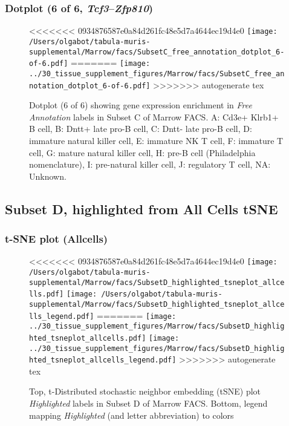 \subsubsection{Dotplot (6 of 6, \emph{Tcf3}--\emph{Zfp810})}
\begin{figure}[h]
\centering
<<<<<<< 0934876587e0a84d261fc48e5d7a4644ec19d4e0
\texttt{[image: /Users/olgabot/tabula-muris-supplemental/Marrow/facs/SubsetC\_free\_annotation\_dotplot\_6-of-6.pdf]}
=======
\texttt{[image: ../30\_tissue\_supplement\_figures/Marrow/facs/SubsetC\_free\_annotation\_dotplot\_6-of-6.pdf]}
>>>>>>> autogenerate tex

\caption{ Dotplot (6 of 6)  showing gene expression enrichment in \emph{Free Annotation} labels in Subset C of Marrow FACS. A: Cd3e+ Klrb1+ B cell, B: Dntt+ late pro-B cell, C: Dntt- late pro-B cell, D: immature natural killer cell, E: immature NK T cell, F: immature T cell, G: mature natural killer cell, H: pre-B cell (Philadelphia nomenclature), I: pre-natural killer cell, J: regulatory T cell, NA: Unknown.}
\end{figure}


\clearpage
\subsection{Subset D, highlighted from All Cells tSNE}
\subsubsection{t-SNE plot (Allcells)}
\begin{figure}[h]
\centering
<<<<<<< 0934876587e0a84d261fc48e5d7a4644ec19d4e0
\texttt{[image: /Users/olgabot/tabula-muris-supplemental/Marrow/facs/SubsetD\_highlighted\_tsneplot\_allcells.pdf]}
\texttt{[image: /Users/olgabot/tabula-muris-supplemental/Marrow/facs/SubsetD\_highlighted\_tsneplot\_allcells\_legend.pdf]}
=======
\texttt{[image: ../30\_tissue\_supplement\_figures/Marrow/facs/SubsetD\_highlighted\_tsneplot\_allcells.pdf]}
\texttt{[image: ../30\_tissue\_supplement\_figures/Marrow/facs/SubsetD\_highlighted\_tsneplot\_allcells\_legend.pdf]}
>>>>>>> autogenerate tex
\caption{Top, t-Distributed stochastic neighbor embedding (tSNE) plot  \emph{Highlighted} labels in Subset D of Marrow FACS. Bottom, legend mapping \emph{Highlighted} (and letter abbreviation) to colors}
\end{figure}


